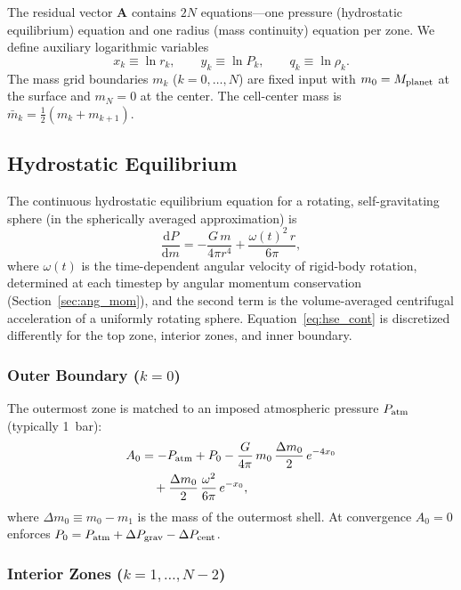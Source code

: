 \documentclass{aastex631}
\newcommand{\dd}{\mathrm{d}}
\begin{document}
The residual vector $\mathbf{A}$ contains $2N$ equations---one pressure
(hydrostatic equilibrium) equation and one radius (mass continuity)
equation per zone.  We define auxiliary logarithmic variables
\begin{equation}
  x_k \equiv \ln r_k, \qquad
  y_k \equiv \ln P_k, \qquad
  q_k \equiv \ln \rho_k.
\end{equation}
The mass grid boundaries $m_k$ ($k = 0,\ldots,N$) are fixed input with
$m_0 = M_{\rm planet}$ at the surface and $m_N = 0$ at the center.
The cell-center mass is $\bar{m}_k = \tfrac{1}{2}(m_k + m_{k+1})$.

\subsection{Hydrostatic Equilibrium}\label{sec:hydrostatic}

The continuous hydrostatic equilibrium equation for a rotating,
self-gravitating sphere (in the spherically averaged approximation) is
\begin{equation}\label{eq:hse_cont}
  \frac{\dd P}{\dd m}
  = -\frac{G\,m}{4\pi r^4}
    + \frac{\omega(t)^2\, r}{6\pi},
\end{equation}
where $\omega(t)$ is the time-dependent angular velocity of rigid-body
rotation, determined at each timestep by angular momentum conservation
(Section~\ref{sec:ang_mom}), and the second term is the volume-averaged
centrifugal acceleration of a uniformly rotating sphere.  Equation~\eqref{eq:hse_cont} is discretized
differently for the top zone, interior zones, and inner boundary.

\subsubsection{Outer Boundary ($k=0$)}

The outermost zone is matched to an imposed atmospheric pressure
$P_{\rm atm}$ (typically 1~bar):
\begin{align}\label{eq:A0}
  A_0 &= -P_{\rm atm} + P_0
        - \frac{G}{4\pi}\,m_0\,\frac{\Delta m_0}{2}\,e^{-4x_0}
        \notag\\
      &\quad + \frac{\Delta m_0}{2}\,\frac{\omega^2}{6\pi}\,e^{-x_0},
\end{align}
where $\Delta m_0 \equiv m_0 - m_1$ is the mass of the outermost shell.
At convergence $A_0 = 0$ enforces $P_0 = P_{\rm atm} +
\Delta P_{\rm grav} - \Delta P_{\rm cent}$.

\subsubsection{Interior Zones ($k = 1,\ldots,N-2$)}
\end{document}
